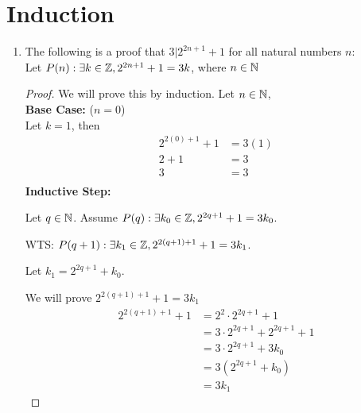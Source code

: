 \documentclass[12pt]{article}
\theoremstyle{definition}
\begin{document}
\newpage
\section{Induction}
\begin{enumerate}
    \item The following is a proof that $3 | 2^{2n+1} + 1$ for all natural numbers $n$:\\
    
    Let $P(n): \exists k \in \mathbb Z, 2^{2n + 1} + 1 = 3k$, where $n \in \mathbb N$
    
    \begin{proof}We will prove this by induction. Let $n \in \mathbb N$, \\
        \textbf{Base Case: } ($n = 0$)\\
        Let $k = 1$, then 
        \begin{align*}
            2^{2(0) + 1} + 1 &= 3(1) \\
            2 + 1 &= 3 \\
            3 &= 3 \\
        \end{align*}
        \textbf{Inductive Step: }
        
        Let $q \in \mathbb N$. Assume $P(q): \exists k_0 \in \mathbb Z, 2^{2q + 1} + 1 = 3k_0$.
        
        WTS: $P(q+1): \exists k_1 \in \mathbb Z, 2^{2(q+1) + 1} + 1 = 3k_1$.
        
        Let $k_1 = 2^{2q + 1} + k_0$.
        
        We will prove $2^{2(q + 1) + 1} + 1 = 3k_1$
        \begin{align*}
            2^{2(q + 1) + 1} + 1 &= 2^2 \cdot 2^{2q + 1} + 1 \\
           &= 3 \cdot 2^{2q + 1} + 2^{2q + 1} + 1 \\
           &= 3 \cdot 2^{2q + 1} + 3k_0  \tag{I.H} \\
           &= 3(2^{2q+1} + k_0) \\
           &= 3k_1 
       \end{align*}
    \end{proof}
    

\end{enumerate}
\end{document}
